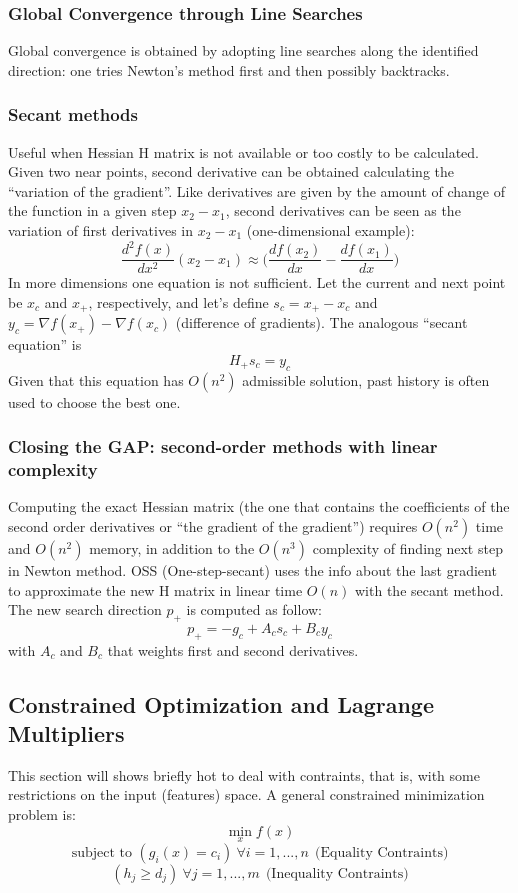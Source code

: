 \documentclass[11pt]{article}
\begin{document}
\subsubsection{Global Convergence through Line Searches}
Global convergence is obtained by adopting line searches along the identified direction: one tries Newton's method first and then possibly backtracks.

\subsubsection{Secant methods}
Useful when Hessian H matrix is not available or too costly to be calculated. Given two near points, second derivative can be obtained calculating the ``variation of the gradient''. Like derivatives are given by the amount of change of the function in a given step $x_{2} - x_{1}$, second derivatives can be seen as the variation of first derivatives in $x_{2} - x_{1}$ (one-dimensional example):
$$ \frac{d^2 f(x)}{d x^2} (x_{2} - x_{1}) \approx \bigg( \frac{df(x_{2})}{dx} - \frac{df(x_{1})}{dx} \bigg) $$
In more dimensions one equation is not sufficient. Let the current and next point be $x_{c}$ and $x_{+}$, respectively, and let's define $s_{c} = x_{+} - x_{c}$ and $y_{c} = \nabla f(x_{+}) - \nabla f(x_{c})$ (difference of gradients). The analogous ``secant equation'' is
$$
H_{+} s_{c} = y_{c}
$$
Given that this equation has $O(n^2)$ admissible solution, past history is often used to choose the best one.

\subsubsection{Closing the GAP: second-order methods with linear complexity}
Computing the exact Hessian matrix (the one that contains the coefficients of the second order derivatives or ``the gradient of the gradient'') requires $O(n^2)$ time and $O(n^2)$ memory, in addition to the $O(n^3)$ complexity of finding next step in Newton method. OSS (One-step-secant) uses the info about the last gradient to approximate the new H matrix in linear time $O(n)$ with the secant method.
The new search direction $p_{+}$ is computed as follow:
$$
p_{+} = -g_{c} + A_{c} s_{c} + B_{c} y_{c}
$$
with $A_{c}$ and $B_{c}$ that weights first and second derivatives.

\subsection{Constrained Optimization and Lagrange Multipliers}
This section will shows briefly hot to deal with contraints, that is, with some restrictions on the input (features) space. A general constrained minimization problem is: 
$$
\min_{x}		f(x)$$
$$\text{subject to }		(g_{i} (x) = c_{i}) \ \forall i = 1,...,n \ \ \text{(Equality Contraints)}$$
$$			(h_{j} \geq d_{j}) \ \forall j = 1,...,m \ \ \text{(Inequality Contraints)}$$
\end{document}
